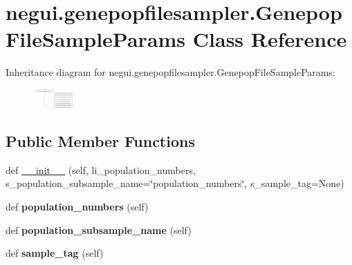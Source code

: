 \hypertarget{classnegui_1_1genepopfilesampler_1_1GenepopFileSampleParams}{}\section{negui.\+genepopfilesampler.\+Genepop\+File\+Sample\+Params Class Reference}
\label{classnegui_1_1genepopfilesampler_1_1GenepopFileSampleParams}
Inheritance diagram for negui.\+genepopfilesampler.\+Genepop\+File\+Sample\+Params\+:\begin{figure}[H]
\begin{center}
\leavevmode
\includegraphics[height=0.715884cm]{classnegui_1_1genepopfilesampler_1_1GenepopFileSampleParams}
\end{center}
\end{figure}
\subsection*{Public Member Functions}
\begin{DoxyCompactItemize}
\item 
def \hyperlink{classnegui_1_1genepopfilesampler_1_1GenepopFileSampleParams_a1731e7a334311beccf587ca3c9d2cea6}{\+\_\+\+\_\+init\+\_\+\+\_\+} (self, li\+\_\+population\+\_\+numbers, s\+\_\+population\+\_\+subsample\+\_\+name=\char`\"{}population\+\_\+numbers\char`\"{}, s\+\_\+sample\+\_\+tag=None)
\item 
def {\bfseries population\+\_\+numbers} (self)\hypertarget{classnegui_1_1genepopfilesampler_1_1GenepopFileSampleParams_a5ecc667eef35a832923e5c4ce659cfe7}{}\label{classnegui_1_1genepopfilesampler_1_1GenepopFileSampleParams_a5ecc667eef35a832923e5c4ce659cfe7}

\item 
def {\bfseries population\+\_\+subsample\+\_\+name} (self)\hypertarget{classnegui_1_1genepopfilesampler_1_1GenepopFileSampleParams_ab3ae1c545edd5230e6c37db9507d0535}{}\label{classnegui_1_1genepopfilesampler_1_1GenepopFileSampleParams_ab3ae1c545edd5230e6c37db9507d0535}

\item 
def {\bfseries sample\+\_\+tag} (self)\hypertarget{classnegui_1_1genepopfilesampler_1_1GenepopFileSampleParams_aa34487d4f6dd79d0313cf0e2038a1ef1}{}\label{classnegui_1_1genepopfilesampler_1_1GenepopFileSampleParams_aa34487d4f6dd79d0313cf0e2038a1ef1}

\end{DoxyCompactItemize}


